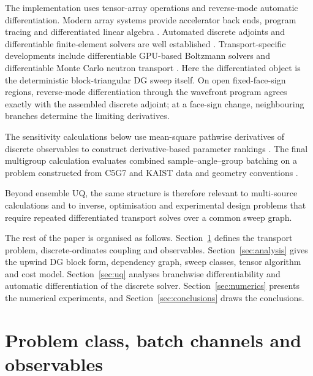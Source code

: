 \documentclass[final]{amsart}
\begin{document}
The implementation uses tensor-array operations and reverse-mode
automatic differentiation. Modern array systems provide accelerator
back ends, program tracing and differentiated linear algebra
\cite{PaszkeEtAl2019PyTorch,FrostigJohnsonLeary2018Tracing,
BaydinEtAl2018ADSurvey}. Automated discrete adjoints and
differentiable finite-element solvers are well established
\cite{FarrellEtAl2013DolfinAdjoint,Giles2008MatrixDerivatives,
BlondelEtAl2022ImplicitDiff,XueEtAl2022JAXFEM}. Transport-specific
developments include differentiable GPU-based Boltzmann solvers and
differentiable Monte Carlo neutron transport
\cite{ShangEtAl2025JAXBTE,DengEtAl2026DifferentiableNeutron}.
Here the differentiated object is the deterministic block-triangular
DG sweep itself. On open fixed-face-sign regions, reverse-mode
differentiation through the wavefront program agrees exactly with the
assembled discrete adjoint; at a face-sign change, neighbouring
branches determine the limiting derivatives.

The sensitivity calculations below use mean-square pathwise derivatives
of discrete observables to construct derivative-based parameter rankings
\cite{SobolKucherenko2009DGSM,Cacuci2003}. The final multigroup
calculation evaluates combined sample--angle--group batching on a problem
constructed from C5G7 and KAIST data and geometry conventions
\cite{LewisSmithNa2001C5G7,SmithLewisNa2005C5G73D,Dahl2006PARTISN,
  Cho2000KAIST1A,KnightBryceHall2013}.

Beyond ensemble UQ, the same structure is therefore relevant to
multi-source calculations and to inverse, optimisation and
experimental design problems that require repeated differentiated
transport solves over a common sweep graph.

The rest of the paper is organised as follows.
Section~\ref{sec:model} defines the transport problem, discrete-ordinates
coupling and observables. Section~\ref{sec:analysis} gives the upwind DG
block form, dependency graph, sweep classes, tensor algorithm and cost
model. Section~\ref{sec:uq} analyses branchwise differentiability and
automatic differentiation of the discrete solver.
Section~\ref{sec:numerics} presents the numerical experiments, and
Section~\ref{sec:conclusions} draws the conclusions.

\section{Problem class, batch channels and observables}
\label{sec:model}
\end{document}
